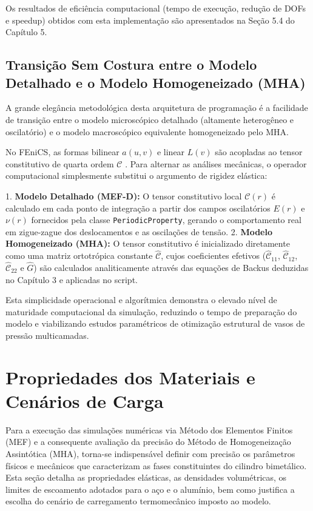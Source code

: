 Os resultados de eficiência computacional (tempo de execução, redução de DOFs e speedup) obtidos com esta implementação são apresentados na Seção 5.4 do Capítulo 5.
\subsection{Transição Sem Costura entre o Modelo Detalhado e o Modelo Homogeneizado (MHA)}

A grande elegância metodológica desta arquitetura de programação é a facilidade de transição entre o modelo microscópico detalhado (altamente heterogêneo e oscilatório) e o modelo macroscópico equivalente homogeneizado pelo MHA.

No FEniCS, as formas bilinear $a(u,v)$ e linear $L(v)$ são acopladas ao tensor constitutivo de quarta ordem $\mathcal{C}$ \cite{logg2012automated}. Para alternar as análises mecânicas, o operador computacional simplesmente substitui o argumento de rigidez elástica:

1. \textbf{Modelo Detalhado (MEF-D):} O tensor constitutivo local $\mathcal{C}(r)$ é calculado em cada ponto de integração a partir dos campos oscilatórios $E(r)$ e $\nu(r)$ fornecidos pela classe \texttt{PeriodicProperty}, gerando o comportamento real em zigue-zague dos deslocamentos e as oscilações de tensão.
2. \textbf{Modelo Homogeneizado (MHA):} O tensor constitutivo é inicializado diretamente como uma matriz ortotrópica constante $\hat{\mathcal{C}}$, cujos coeficientes efetivos ($\hat{\mathcal{C}}_{11}$, $\hat{\mathcal{C}}_{12}$, $\hat{\mathcal{C}}_{22}$ e $\hat{G}$) são calculados analiticamente através das equações de Backus deduzidas no Capítulo 3 e aplicadas no script.

Esta simplicidade operacional e algorítmica demonstra o elevado nível de maturidade computacional da simulação, reduzindo o tempo de preparação do modelo e viabilizando estudos paramétricos de otimização estrutural de vasos de pressão multicamadas.

\section{Propriedades dos Materiais e Cenários de Carga}\label{sec:propriedades_cenarios}

Para a execução das simulações numéricas via Método dos Elementos Finitos (MEF) e a consequente avaliação da precisão do Método de Homogeneização Assintótica (MHA), torna-se indispensável definir com precisão os parâmetros físicos e mecânicos que caracterizam as fases constituintes do cilindro bimetálico. Esta seção detalha as propriedades elásticas, as densidades volumétricas, os limites de escoamento adotados para o aço e o alumínio, bem como justifica a escolha do cenário de carregamento termomecânico imposto ao modelo.

